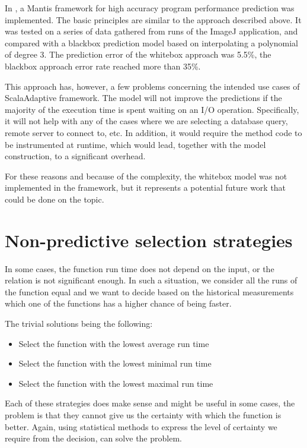 In \cite{chun_mantis:_2010}, a Mantis framework for high accuracy program performance prediction was implemented. The basic principles are similar to the approach described above. It was tested on a series of data gathered from runs of the ImageJ application, and compared with a blackbox prediction model based on interpolating a polynomial of degree 3. The prediction error of the whitebox approach was 5.5\%, the blackbox approach error rate reached more than 35\%.

This approach has, however, a few problems concerning the intended use cases of ScalaAdaptive framework. The model will not improve the predictions if the majority of the execution time is spent waiting on an I/O operation. Specifically, it will not help with any of the cases where we are selecting a database query, remote server to connect to, etc. In addition, it would require the method code to be instrumented at runtime, which would lead, together with the model construction, to a significant overhead.

For these reasons and because of the complexity, the whitebox model was not implemented in the framework, but it represents a potential future work that could be done on the topic.

\section{Non-predictive selection strategies}
\label{sec:non_predictive_strategies}

In some cases, the function run time does not depend on the input, or the relation is not significant enough. In such a situation, we consider all the runs of the function equal and we want to decide based on the historical measurements which one of the functions has a higher chance of being faster.

The trivial solutions being the following:
\begin{itemize}
	\item Select the function with the lowest average run time
	\item Select the function with the lowest minimal run time
	\item Select the function with the lowest maximal run time
\end{itemize}

Each of these strategies does make sense and might be useful in some cases, the problem is that they cannot give us the certainty with which the function is better. Again, using statistical methods to express the level of certainty we require from the decision, can solve the problem.

